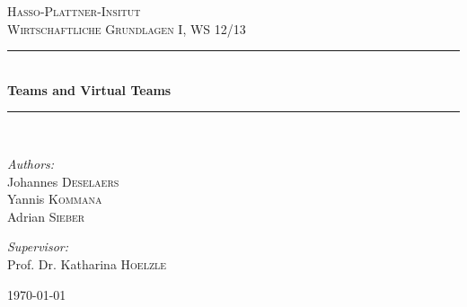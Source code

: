 \begin{titlepage}

\begin{center}



\textsc{\LARGE Hasso-Plattner-Insitut}\\[1.5cm]

\textsc{\Large Wirtschaftliche Grundlagen I, WS 12/13}
\\[0.5cm]


\rule{\linewidth}{0.5mm} \\[0.4cm]
{ \huge \bfseries Teams and Virtual Teams}\\[0.4cm]
\rule{\linewidth}{0.5mm} \\[1.5cm]

\vfill

\begin{minipage}{0.4\textwidth}
	\emph{Authors:}\\
	Johannes \textsc{Deselaers}\\
	Yannis \textsc{Kommana}\\
	Adrian \textsc{Sieber}
\end{minipage}

\vfill

\begin{minipage}{0.4\textwidth}
	\emph{Supervisor:} \\
	Prof. Dr. Katharina \textsc{Hoelzle}
\end{minipage}


\vfill

{\large \today}
\end{center}



\end{titlepage}